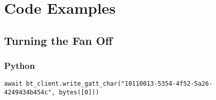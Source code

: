 \chapter{Code Examples}
\section{Turning the Fan Off}
    \subsection{Python}
        \begin{lstlisting}[caption=Example of Python code]
            await bt_client.write_gatt_char("10110013-5354-4f52-5a26-4249434b454c", bytes([0]))
        \end{lstlisting}
    